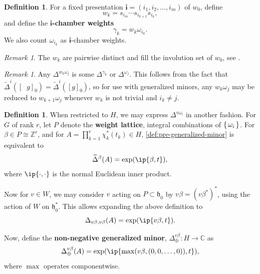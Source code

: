 \documentclass{amsart}
\theoremstyle{plain}
\theoremstyle{definition}
\newtheorem{definition}[theorem]{Definition}
\theoremstyle{remark}
\newtheorem{remark}[theorem]{Remark}
\newcommand{\defined}[1]{\textbf{#1}}
\newcommand{\fundamentalweight}{\omega}
\newcommand{\genminor}[2]{\Delta^{{#1} \fundamentalweight_{#2}}}
\newcommand{\genminorgk}[1]{\Delta^{\gamma_{#1}}}
\newcommand{\genminornumerator}[2]{\Delta_{\oplus}^{{#1} {#2}}}
\newcommand{\dlifttoG}[1]{{\mathop{\overline{\overline{#1}}}}}
\newcommand{\pregenminor}[1]{\widetilde{\Delta}^{#1}}
\newcommand{\torush}{\chi^{\ast}}
\newcommand{\word}[1]{\mathbf{#1}}
\DeclarePairedDelimiter\ip\langle\rangle
\begin{document}
  \begin{definition}
    \label{def:gamma-k}
    For a fixed presentation $\word{i} = (i_1, i_2, \dotsc, i_m)$ of
    $w_0$, define \[ w_k = s_{i_m} \dotsb s_{i_{k+1}} s_{i_k}, \] and
    define the \defined{$\word{i}$-chamber weights} \[ \gamma_k = w_k
      \fundamentalweight_{i_k}. \] We also count
    $\fundamentalweight_{i_k}$ as $\word{i}$-chamber weights.
  \end{definition}

  \begin{remark}
    The $w_k$ are pairwise distinct and fill the involution set of
    $w_0$, see \cite[Chapter VI, ]{bourbaki2002_46}.
  \end{remark}

  \begin{remark}
    \label{rem:all-wkomegaj-are-gamma-k-or-trivial}
    Any $\genminor{w_k}{j}$ is some $\genminorgk{k}$ or
    $\genminor{}{j}$. This follows from the fact that
    $\pregenminor{i}([\dlifttoG{s_{j \ne i}} g]_{0}) =
    \pregenminor{i}([g]_{0})$, so for use with generalized minors, any
    $w_k \fundamentalweight_{j}$ may be reduced to $w_{k+1}
    \fundamentalweight_{j}$ whenever $w_k$ is not trivial and $i_k \ne
    j$.
  \end{remark}

  \begin{definition}
    \label{def:non-negative-generalized-minor}
    When restricted to $H$, we may express $\genminor{v}{i}$ in another
    fashion. For $G$ of rank $r$, let $P$ denote the \defined{weight
      lattice}, integral combinations of $\set{\fundamentalweight_i}$.
    For $\beta \in P \cong \mathbb{Z}^r$, and for $A = \prod_{k=1}^{r}
    \torush_k(t_k) \in H$, \cref{def:pre-generalized-minor} is
    equivalent to \[ \pregenminor{\beta}(A) = \exp( \ip{\beta, t} ), \]
    where $\ip{\cdot, \cdot}$ is the normal Euclidean inner product.

    Now for $v \in W$, we may consider $v$ acting on $P \subset
    \mathfrak{h}_0$ by $v \beta = (v \beta^{\ast})^{\ast}$, using the
    action of $W$ on $\mathfrak{h}_{0}^{\ast}$. This allows expanding
    the above definition to \[ \Delta_{v \beta, v \beta}(A) = \exp(\ip{v
        \beta, t}). \]

    Now, define the \defined{non-negative generalized minor},
    $\genminornumerator{v}{\beta} : H \to \mathbb{C}$ as \[
      \genminornumerator{v}{\beta}(A) = \exp(\ip{ \max(v \beta, (0, 0,
        \dotsc, 0)), t}), \] where $\max$ operates componentwise.
  \end{definition}
\end{document}
